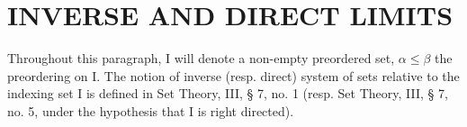 \section{INVERSE AND DIRECT LIMITS}

Throughout this paragraph, I will denote a non-empty preordered set, \(\alpha \leqslant \beta\) the preordering on I. The notion of inverse (resp. direct) system of sets relative to the indexing set I is defined in Set Theory, III, § 7, no. 1 (resp. Set Theory, III, § 7, no. 5, under the hypothesis that I is right directed).

